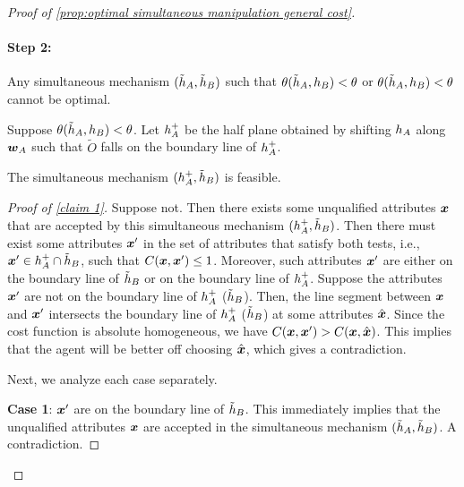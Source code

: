 \begin{proof}[Proof of \cref{prop:optimal simultaneous manipulation general cost}]
\paragraph{Step 2:} Any simultaneous mechanism $(\tilde {h}_A,\tilde {h}_B)$ such that $\theta( \tilde{h}_A,h_B)<\theta$ or $\theta( \tilde{h}_A,h_B)<\theta$ cannot be optimal.

Suppose $\theta( \tilde{h}_A,h_B)<\theta$.
Let $h_A^+$ be the half plane obtained by shifting $h_A$ along $\boldsymbol{w}_A$ such that $\tilde O$ falls on the boundary line of  $h_A^+$.

\begin{claim}\label{claim 1}
    The simultaneous mechanism $(h_A^+,\tilde {h}_B)$ is feasible.
\end{claim}

\begin{proof}[Proof of \cref{claim 1}]
    Suppose not. Then there exists some unqualified attributes $\boldsymbol{x}$ that are accepted by this simultaneous mechanism $(h_A^+,\tilde {h}_B)$.
    Then there must exist some attributes $\boldsymbol{x}'$ in the set of attributes that satisfy both tests, i.e., $\boldsymbol{x}'\in h_A^+\cap\tilde {h}_B$, such that $C(\boldsymbol{x},\boldsymbol{x}')\leq 1$.
    Moreover, such attributes $\boldsymbol{x}'$ are either on the boundary line of $\tilde{h}_B$ or on the boundary line of $h_A^+$.
    Suppose the attributes $\boldsymbol{x}'$ are not on the boundary line of  $h_A^+$ ($\tilde{h}_B$). 
    Then, the line segment between $\boldsymbol{x}$ and $\boldsymbol{x}'$ intersects the boundary line of $h_A^+$ ($\tilde{h}_B$) at some attributes $\hat {\boldsymbol{x}}$. 
    Since the cost function is absolute homogeneous, we have  
    $
        C(\boldsymbol{x},\boldsymbol{x}') 
        > C(\boldsymbol{x},\hat{\boldsymbol{x}}) 
    $.
    This implies that the agent will be better off choosing $\hat{\boldsymbol{x}}$, which gives a contradiction.
    
    Next, we analyze each case separately.

    \textbf{Case 1}:  $\boldsymbol{x}'$ are on the boundary line of $\tilde{h}_B$. 
    This immediately implies that the unqualified attributes $\boldsymbol{x}$ are accepted in the simultaneous mechanism $(\tilde {h}_A,\tilde {h}_B)$.
    A contradiction.


\end{proof}
\end{proof}
